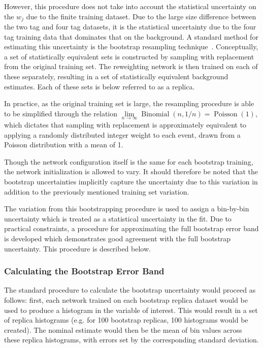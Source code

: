 However, this procedure does not take into account the statistical uncertainty
on the $w_j$ due to the finite training dataset. Due to the large size
difference between the two tag and four tag datasets, it is the statistical
uncertainty due to the four tag training data that dominates that on the
background. A standard method for estimating this uncertainty is the bootstrap
resampling technique~\cite{Bootstrap}. Conceptually, a set of statistically
equivalent sets is constructed by sampling with replacement from the original
training set. The reweighting network is then trained on each of these
separately, resulting in a set of statistically equivalent background estimates.
Each of these sets is below referred to as a replica.

In practice, as the original training set is large, the resampling procedure is
able to be simplified through the relation $\lim\limits_{n\rightarrow \infty}
	\operatorname{Binomial}(n, 1/n) = \operatorname{Poisson}(1)$, which dictates that sampling
with replacement is approximately equivalent to applying a randomly distributed
integer weight to each event, drawn from a Poisson distribution with a mean of
1.

Though the network configuration itself is the same for each bootstrap training, the
network initialization is allowed to vary. It should therefore be noted that the bootstrap
uncertainties implicitly capture the uncertainty due to this variation in addition to
the previously mentioned training set variation.

The variation from this bootstrapping procedure is used to assign a bin-by-bin uncertainty
which is treated as a statistical uncertainty in the fit. Due to practical constraints,
a procedure for approximating the full bootstrap error band is developed which demonstrates
good agreement with the full bootstrap uncertainty. This procedure is described below.

\subsubsection{Calculating the Bootstrap Error Band}
The standard procedure to calculate the bootstrap uncertainty would proceed as 
follows: first, each network trained on each bootstrap replica dataset would be used
to produce a histogram in the variable of interest. This would result in a set of 
replica histograms (e.g. for 100 bootstrap replicas, 100 histograms would be created). 
The nominal estimate would then be the mean of bin values across these replica histograms, 
with errors set by the corresponding standard deviation.


